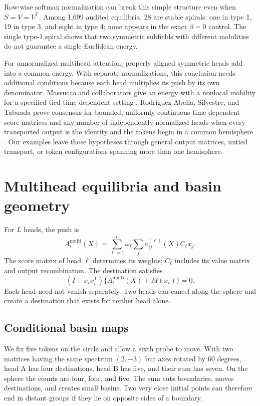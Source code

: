 \documentclass[11pt,a4paper]{article}
\theoremstyle{definition}
\newcommand{\T}{\mathsf T}
\begin{document}
Row-wise softmax normalization can break this simple structure even when
$S=V=V^{\T}$. Among 1,699 audited equilibria, 28 are stable spirals: one in type 1,
19 in type 3, and eight in type 4; none appears in the exact $\beta=0$ control. The
single type-1 spiral shows that two symmetric subfields with different mobilities do
not guarantee a single Euclidean energy.

For unnormalized multihead attention, properly aligned symmetric heads add into a
common energy. With separate normalizations, this conclusion needs additional
conditions because each head multiplies its push by its own denominator. Massucco and
collaborators give an energy with a nonlocal mobility for a specified tied
time-dependent setting \cite{massucco2026time}.  Rodr\'iguez Abella, Silvestre, and
Tabuada prove consensus for bounded, uniformly continuous time-dependent score
matrices and any
number of independently normalized heads when every transported output is the
identity and the tokens begin in a common hemisphere
\cite{rodriguez2025asymptotic}.  Our examples leave those hypotheses through general
output matrices, untied transport, or token configurations spanning more than one
hemisphere.

\section{Multihead equilibria and basin geometry}
\label{sec:multihead}

For $L$ heads, the push is
\begin{equation}
 A_i^{\mathrm{multi}}(X)=\sum_{\ell=1}^{L}\omega_\ell
 \sum_j a_{ij}^{(\ell)}(X)C_\ell x_j.\label{eq:multihead}
\end{equation}
The score matrix of head $\ell$ determines its weights; $C_\ell$ includes its value matrix
and output recombination. The destination satisfies
\[
 (I-x_ix_i^{\T})\{A_i^{\mathrm{multi}}(X)+M(x_i)\}=0.
\]
Each head need not vanish separately. Two heads can cancel along the sphere and create
a destination that exists for neither head alone.

\subsection{Conditional basin maps}

We fix five tokens on the circle and allow a sixth probe to move. With two matrices
having the same spectrum $(2,-3)$ but axes rotated by 60 degrees, head A has four
destinations, head B has five, and their sum has seven. On the sphere the counts are
four, four, and five. The sum cuts boundaries, moves destinations, and creates small
basins. Two very close initial points can therefore end in distant groups if they lie
on opposite sides of a boundary.
\end{document}
